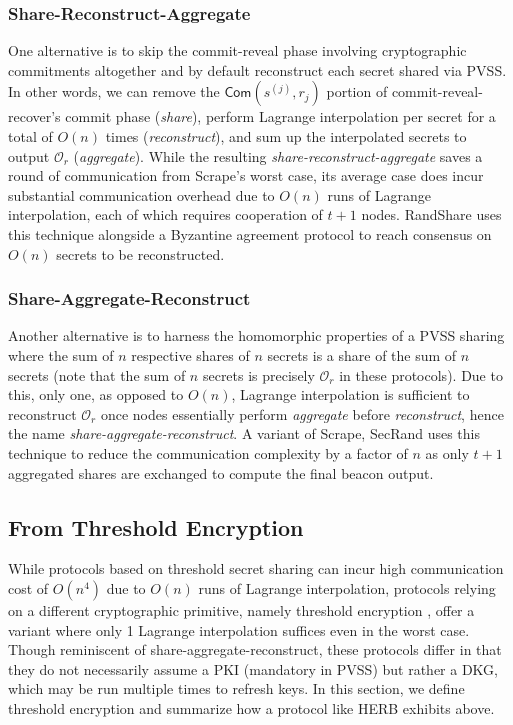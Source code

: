 \documentclass[letterpaper,twocolumn,10pt]{article}
\theoremstyle{definition}
\theoremstyle{remark}
\begin{document}
\subsubsection{Share-Reconstruct-Aggregate}
One alternative is to skip the commit-reveal phase involving cryptographic commitments altogether and by default reconstruct each secret shared via PVSS. In other words, we can remove the $\mathsf{Com}(s^{(j)}, r_j)$ portion of commit-reveal-recover's commit phase (\textit{share}), perform Lagrange interpolation per secret for a total of $O(n)$ times (\textit{reconstruct}), and sum up the interpolated secrets to output $\mathcal{O}_r$ (\textit{aggregate}). While the resulting \textit{share-reconstruct-aggregate} saves a round of communication from Scrape's worst case, its average case does incur substantial communication overhead due to $O(n)$ runs of Lagrange interpolation, each of which requires cooperation of $t + 1$ nodes. RandShare \cite{syta2017scalable} uses this technique alongside a Byzantine agreement protocol to reach consensus on $O(n)$ secrets to be reconstructed.

\subsubsection{Share-Aggregate-Reconstruct}
Another alternative is to harness the homomorphic properties of a PVSS sharing where the sum of $n$ respective shares of $n$ secrets is a share of the sum of $n$ secrets (note that the sum of $n$ secrets is precisely $\mathcal{O}_r$ in these protocols). Due to this, only one, as opposed to $O(n)$, Lagrange interpolation is sufficient to reconstruct $\mathcal{O}_r$ once nodes essentially perform \textit{aggregate} before \textit{reconstruct}, hence the name \textit{share-aggregate-reconstruct}. A variant of Scrape, SecRand \cite{guo2020secRand} uses this technique to reduce the communication complexity by a factor of $n$ as only $t + 1$ aggregated shares are exchanged to compute the final beacon output.

\subsection{From Threshold Encryption}
While protocols based on threshold secret sharing can incur high communication cost of $O(n^4)$ due to $O(n)$ runs of Lagrange interpolation, protocols relying on a different cryptographic primitive, namely threshold encryption \cite{de1994share, desmedt1990Threshold}, offer a variant where only 1 Lagrange interpolation suffices even in the worst case. Though reminiscent of share-aggregate-reconstruct, these protocols differ in that they do not necessarily assume a PKI (mandatory in PVSS) but rather a DKG, which may be run multiple times to refresh keys. In this section, we define threshold encryption and summarize how a protocol like HERB \cite{cherniaeva2019homomorphic} exhibits above.
\end{document}
